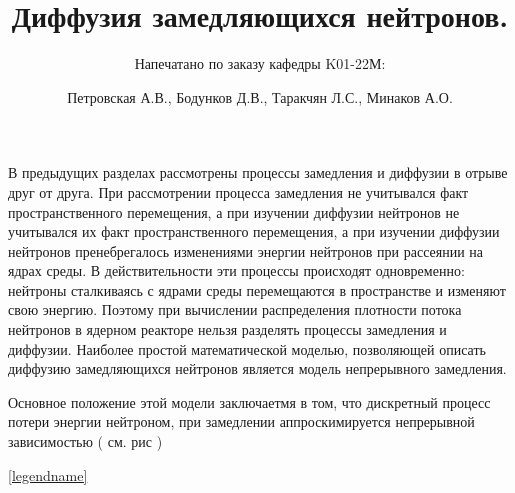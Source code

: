 \documentclass[a4paper]{article}
\title{Диффузия замедляющихся нейтронов.}
\author{
    Напечатано по заказу кафедры K01-22М:
    \and
    Петровская А.В., Бодунков Д.В., Таракчян Л.С., Минаков А.О.}
\date{}
\begin{document}
    \maketitle
    В предыдущих разделах рассмотрены процессы замедления
    и диффузии в отрыве друг от друга. При рассмотрении процесса
    замедления не учитывался факт пространственного перемещения,
    а при изучении диффузии нейтронов не учитывался их факт
    пространственного перемещения, а при изучении диффузии нейтронов
    пренебрегалось изменениями энергии нейтронов при рассеянии на
    ядрах среды. В действительности эти процессы происходят
    одновременно: нейтроны сталкиваясь с ядрами среды перемещаются
    в пространстве и изменяют свою энергию. Поэтому при вычислении
    распределения плотности потока нейтронов в ядерном реакторе
    нельзя разделять процессы замедления и диффузии. Наиболее
    простой математической моделью, позволяющей описать диффузию
    замедляющихся нейтронов является модель непрерывного замедления.

    Основное положение этой модели заключаетмя в том, что
    дискретный процесс потери энергии нейтроном, при замедлении
    аппроскимируется непрерывной зависимостью ( см. рис )

    \newline
    \ref{legendname}
\end{document}
